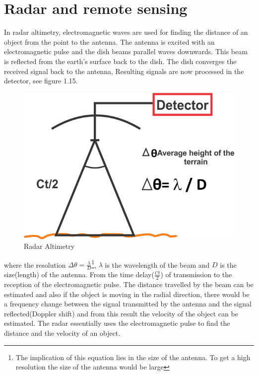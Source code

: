 \section{Radar and remote sensing}
In radar altimetry, electromagnetic waves are used for finding the distance of an object from the point to the antenna. The antenna is excited with an electromagnetic pulse and the dish beams parallel waves downwards. This beam is reflected from the earth's surface back to the dish. The dish converges the received signal back to the antenna, Resulting signals are now processed in the detector, see figure 1.15.
\begin{figure}[h]
\centering
\includegraphics[scale=0.6]{./graphics/New}
\caption{Radar Altimetry}
\end{figure}

where the resolution $\Delta \theta = \frac{\lambda}{D}$\footnote{The implication of this equation lies in the size of the antenna. To get a high resolution the size of the antenna would be large}, $\lambda$ is the wavelength of the beam and $D$ is the size(length) of the antenna. 
From the time delay($\frac{C t}{2}$) of transmission to the reception of the electromagnetic pulse. The distance travelled by the beam can be estimated and also if the object is moving in the radial direction, there would be a frequency change between the signal transmitted by the antenna and the signal reflected(Doppler shift) and from this result the velocity of the object can be estimated. The radar essentially uses the electromagnetic pulse to find the distance and the velocity of an object.\\


